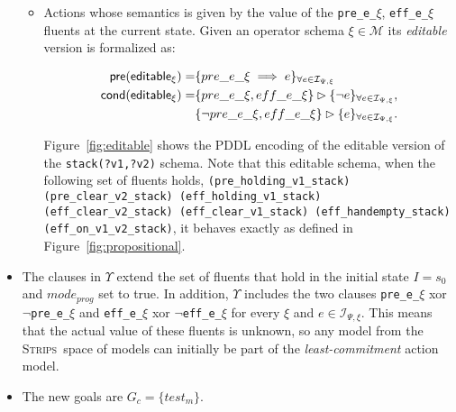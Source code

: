 \documentclass{article}
\newcommand{\pre}{\mathsf{pre}}     %
\newcommand{\cond}{\mathsf{cond}}   %
\newcommand{\strips}{\textsc{Strips}}
\begin{document}
\begin{itemize}
\begin{itemize}
      \item Actions whose semantics is given by the value of the {\tt\small pre\_e\_$\xi$}, {\tt\small eff\_e\_$\xi$} fluents at the current state. Given an operator schema $\xi\in\mathcal{M}$ its {\em editable} version is formalized as:
\begin{small}  
\begin{align*}
\hspace*{7pt}\pre(\mathsf{editable_{\xi}})=&\{pre\_e\_\xi\implies e\}_{\forall e\in{\mathcal I}_{\Psi,\xi}}\\
\cond(\mathsf{editable_{\xi}})=&\{pre\_e\_\xi, eff\_e\_\xi\}\rhd\{\neg e\}_{\forall e\in{\mathcal I}_{\Psi,\xi}},\\
&\{\neg pre\_e\_\xi, eff\_e\_\xi\}\rhd\{e\}_{\forall e\in{\mathcal I}_{\Psi,\xi}}.
\end{align*}
\end{small}
Figure~\ref{fig:editable} shows the PDDL encoding of the editable version of the {\tt\small stack(?v1,?v2)} schema. Note that this editable schema, when the following set of fluents holds, {\tiny\tt (pre\_holding\_v1\_stack) (pre\_clear\_v2\_stack) (eff\_holding\_v1\_stack) (eff\_clear\_v2\_stack) (eff\_clear\_v1\_stack) (eff\_handempty\_stack) (eff\_on\_v1\_v2\_stack)}, it behaves exactly as defined in Figure~\ref{fig:propositional}.     
\end{itemize}

\item The clauses in $\Upsilon$ extend the set of fluents that hold in the initial state $I=s_0$ and $mode_{prog}$ set to true. In addition, $\Upsilon$ includes the two clauses {\tt\small pre\_e\_$\xi$} xor {\tt\small $\neg$pre\_e\_$\xi$} and {\tt\small eff\_e\_$\xi$} xor {\tt\small $\neg$eff\_e\_$\xi$} for every $\xi$ and $e\in{\mathcal I}_{\Psi,\xi}$. This means that the actual value of these fluents is unknown, so any model from the \strips\ space of models can initially be part of the {\em least-commitment} action model. 

\item The new goals are $G_c=\{test_m\}$.
\end{itemize}
\end{document}
